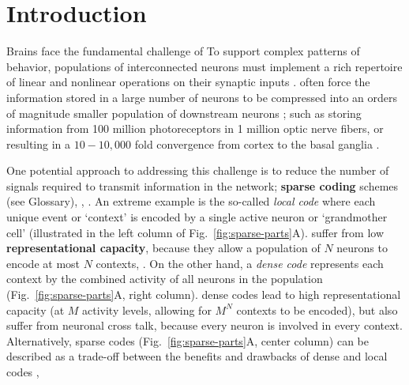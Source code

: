 \section*{Introduction}
\label{sec:introduction}

Brains face the fundamental challenge of 
To support complex patterns of behavior, 
populations of interconnected neurons must implement 
a rich repertoire of linear and nonlinear operations on their synaptic inputs
\cite{Koch1999}.
often force the information stored in a large number of neurons
to be compressed into an orders of magnitude smaller population
of downstream neurons
\cite{Kempermann2002,BarGad2003_Review,Babinsky1993};
such as storing information from 100 million photoreceptors 
in 1 million optic nerve fibers,
or resulting in a $10 - 10,000$ fold convergence from cortex to the basal ganglia
\cite{BarGad2003_Review}.

One potential approach to addressing this challenge is to
reduce the number of signals required to transmit information in the network;
 \textbf{sparse coding} schemes (see Glossary),
, 
\cite{Foldiak1990,Field1994,LevyBaxter1996}.
An extreme example is the so-called \emph{local code}
where each unique event or `context' is encoded by a single active neuron
or `grandmother cell' \cite{RollsTreves1990}
(illustrated in the left column of Fig.~\ref{fig:sparse-parts}A).
 suffer from low \textbf{representational capacity},
because they allow a population of $N$ neurons to encode at most $N$ contexts,
.
On the other hand, a \emph{dense code}
represents each context by the combined activity
of all neurons in the population
(Fig.~\ref{fig:sparse-parts}A, right column).
dense codes lead to high representational capacity
(at $M$ activity levels, allowing for $M^N$ contexts to be encoded),
but also suffer from neuronal cross talk,
because every neuron is involved in every context.
Alternatively, sparse codes
(Fig.~\ref{fig:sparse-parts}A, center column)
can be described as a trade-off between the benefits and
drawbacks of dense and local codes 
\cite{SpanneJorntell2015,Foldiak1990},


